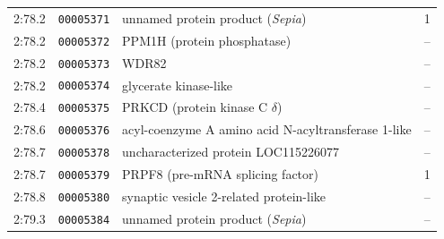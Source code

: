 \begin{longtable}{llp{72mm}c}
    2:78.2 & \texttt{00005371} & unnamed protein product (\textit{Sepia}) & 1 \\
    2:78.2 & \texttt{00005372} & PPM1H (protein phosphatase) & -- \\
    2:78.2 & \texttt{00005373} & WDR82 & -- \\
    2:78.2 & \texttt{00005374} & glycerate kinase-like & -- \\
    2:78.4 & \texttt{00005375} & PRKCD (protein kinase C $\delta$) & -- \\
    2:78.6 & \texttt{00005376} & acyl-coenzyme A amino acid N-acyltransferase 1-like & -- \\
    2:78.7 & \texttt{00005378} & uncharacterized protein LOC115226077 & -- \\
    2:78.7 & \texttt{00005379} & PRPF8 (pre-mRNA splicing factor) & 1 \\
    2:78.8 & \texttt{00005380} & synaptic vesicle 2-related protein-like & -- \\
    2:79.3 & \texttt{00005384} & unnamed protein product (\textit{Sepia}) & -- \\
\end{longtable}
\endgroup
